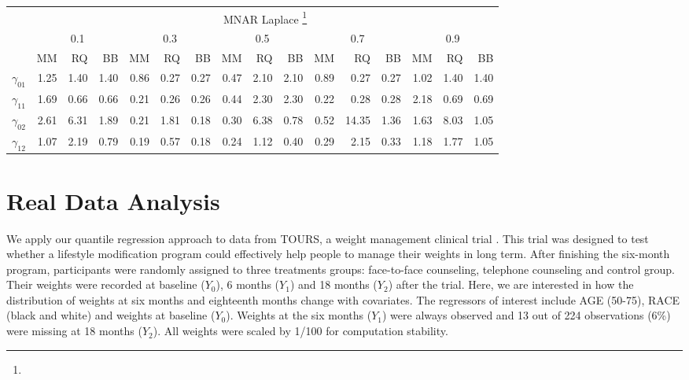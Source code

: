 \documentclass[12pt]{article}
\begin{document}
\begin{table}[h]
  \begin{tabular}{rrrrrrrrrrrrrrrr}
    \toprule
    & \multicolumn{15}{c}{MNAR Laplace \footnote{}} \\
    \cline{2-16}
    &  \multicolumn{3}{c}{0.1} &  \multicolumn{3}{c}{0.3} &  \multicolumn{3}{c}{0.5} &
    \multicolumn{3}{c}{0.7} &  \multicolumn{3}{c}{0.9} \\
    \cline{2-16}
    & MM   & RQ   & BB   & MM   & RQ   & BB   & MM   & RQ   & BB   & MM   & RQ   & BB   & MM   & RQ   & BB   \\
    \hline
    $\gamma_{01}$ & 1.25 & 1.40 & 1.40 & 0.86 & 0.27 & 0.27 & 0.47 & 2.10 & 2.10 & 0.89 & 0.27 & 0.27 & 1.02 & 1.40 & 1.40  \\
    $\gamma_{11}$ & 1.69 & 0.66 & 0.66 & 0.21 & 0.26 & 0.26 & 0.44 & 2.30 & 2.30 & 0.22 & 0.28 & 0.28 & 2.18 & 0.69 & 0.69  \\
    $\gamma_{02}$ & 2.61 & 6.31 & 1.89 & 0.21 & 1.81 & 0.18 & 0.30 & 6.38 & 0.78 & 0.52 & 14.35 & 1.36 & 1.63 & 8.03 & 1.05 \\
    $\gamma_{12}$ & 1.07 & 2.19 & 0.79 & 0.19 & 0.57 & 0.18 & 0.24 & 1.12 & 0.40 & 0.29 & 2.15 & 0.33 & 1.18 & 1.77 & 1.05  \\
    \bottomrule
  \end{tabular}

\end{table}

\section{Real Data Analysis}
\label{sec:real}
We apply our quantile regression approach to data from TOURS, a weight
management clinical trial \citep{perri2008extended}.  This trial was
designed to test whether a lifestyle modification program could
effectively help people to manage their weights in long term. After
finishing the six-month program, participants were randomly assigned
to three treatments groups: face-to-face counseling, telephone
counseling and control group. Their weights were recorded at baseline
($Y_0$), 6 months ($Y_1$) and 18 months ($Y_2$) after the trial. Here,
we are interested in how the distribution of weights at six months and
eighteenth months change with covariates. The regressors of interest
include AGE (50-75), RACE (black and white) and weights at baseline
($Y_0$). Weights at the six months ($Y_1$) were always observed and 13
out of 224 observations (6\%) were missing at 18 months ($Y_2$). All
weights were scaled by 1/100 for computation stability.
\end{document}
